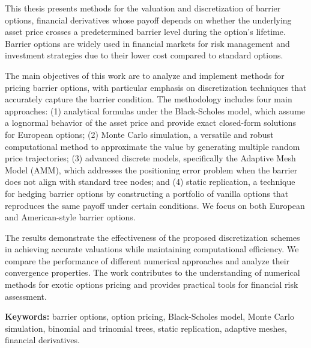 This thesis presents methods for the valuation and discretization of barrier options, financial derivatives whose payoff depends on whether the underlying asset price crosses a predetermined barrier level during the option's lifetime. Barrier options are widely used in financial markets for risk management and investment strategies due to their lower cost compared to standard options.

The main objectives of this work are to analyze and implement methods for pricing barrier options, with particular emphasis on discretization techniques that accurately capture the barrier condition. The methodology includes four main approaches: (1) analytical formulas under the Black-Scholes model, which assume a lognormal behavior of the asset price and provide exact closed-form solutions for European options; (2) Monte Carlo simulation, a versatile and robust computational method to approximate the value by generating multiple random price trajectories; (3) advanced discrete models, specifically the Adaptive Mesh Model (AMM), which addresses the positioning error problem when the barrier does not align with standard tree nodes; and (4) static replication, a technique for hedging barrier options by constructing a portfolio of vanilla options that reproduces the same payoff under certain conditions. We focus on both European and American-style barrier options.

The results demonstrate the effectiveness of the proposed discretization schemes in achieving accurate valuations while maintaining computational efficiency. We compare the performance of different numerical approaches and analyze their convergence properties. The work contributes to the understanding of numerical methods for exotic options pricing and provides practical tools for financial risk assessment.

\textbf{Keywords:} barrier options, option pricing, Black-Scholes model, Monte Carlo simulation, binomial and trinomial trees, static replication, adaptive meshes, financial derivatives.
